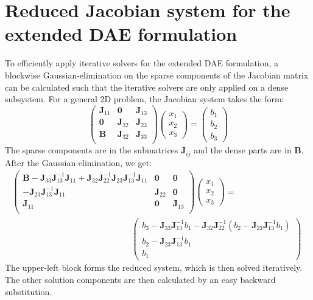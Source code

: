 \section{Reduced Jacobian system for the extended DAE formulation}
\label{apx:ReducedJacobianExtendedDAE}
To efficiently apply iterative solvers for the extended DAE formulation, a blockwise Gaussian-elimination on the sparse components of the Jacobian matrix can be calculated such that the iterative solvers are only applied on a dense subsystem. For a general 2D problem, the Jacobian system takes the form: 
\begin{equation}
\begin{pmatrix}
\mathbf{J}_{11} & \mathbf{0}      & \mathbf{J}_{13} \\
\mathbf{0}      & \mathbf{J}_{22} & \mathbf{J}_{23}   \\
\mathbf{B}      & \mathbf{J}_{32} & \mathbf{J}_{33}   \\
\end{pmatrix}\begin{pmatrix}
x_1 \\ x_2 \\ x_3 
\end{pmatrix} = \begin{pmatrix}
b_1 \\ b_2 \\ b_3 
\end{pmatrix}
\end{equation}
The sparse components are in the submatrices $\mathbf{J}_{ij}$ and the dense parts are in $\mathbf{B}$. After the Gaussian elimination, we get:
\begin{align}
\begin{pmatrix}
\mathbf{B} - \mathbf{J}_{33}\mathbf{J}_{13}^{-1}\mathbf{J}_{11} + \mathbf{J}_{32}\mathbf{J}_{22}^{-1}\mathbf{J}_{23}\mathbf{J}_{13}^{-1}\mathbf{J}_{11} & \mathbf{0} & \mathbf{0} \\
-\mathbf{J}_{23}\mathbf{J}_{13}^{-1}\mathbf{J}_{11} & \mathbf{J}_{22} & \mathbf{0}   \\
\mathbf{J}_{11} & \mathbf{0} & \mathbf{J}_{13} \\
\end{pmatrix}\begin{pmatrix}
x_1 \\ x_2 \\ x_3 
\end{pmatrix} =  \qquad\qquad\qquad\qquad\nonumber \\ \qquad\qquad\qquad\qquad\qquad\qquad\qquad
\begin{pmatrix}
b_3 - \mathbf{J}_{33}\mathbf{J}_{13}^{-1}b_1 - \mathbf{J}_{32}\mathbf{J}_{22}^{-1}\left(b_2 - \mathbf{J}_{23}\mathbf{J}_{13}^{-1}b_1\right) 
\\ b_2 - \mathbf{J}_{23}\mathbf{J}_{13}^{-1}b_1 
\\ b_1 
\end{pmatrix}
\end{align}
The upper-left block forms the reduced system, which is then solved iteratively. The other solution components are then calculated by an easy backward substitution.

